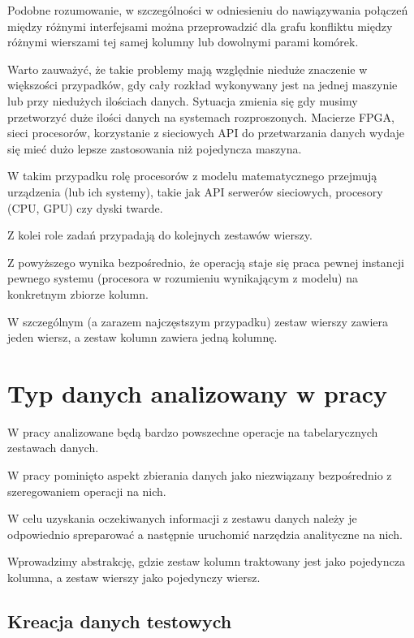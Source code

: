 \documentclass[brudnopis]{xmgr}
\begin{document}
Podobne rozumowanie, w szczególności w odniesieniu do nawiązywania połączeń między różnymi interfejsami można przeprowadzić dla grafu konfliktu między różnymi wierszami tej samej kolumny lub dowolnymi parami komórek.

Warto zauważyć, że takie problemy mają względnie nieduże znaczenie w większości przypadków, gdy cały rozkład wykonywany jest na jednej maszynie lub przy niedużych ilościach danych. Sytuacja zmienia się gdy musimy przetworzyć duże ilości danych na systemach rozproszonych.
Macierze FPGA, sieci procesorów, korzystanie z sieciowych API do przetwarzania danych wydaje się mieć dużo lepsze zastosowania niż pojedyncza maszyna.

W takim przypadku rolę procesorów z modelu matematycznego przejmują urządzenia (lub ich systemy), takie jak API serwerów sieciowych, procesory (CPU, GPU) czy dyski twarde.

Z kolei role zadań przypadają do kolejnych zestawów wierszy.

Z powyższego wynika bezpośrednio, że operacją staje się praca pewnej instancji pewnego systemu (procesora w rozumieniu wynikającym z modelu) na konkretnym zbiorze kolumn.

W szczególnym (a zarazem najczęstszym przypadku) zestaw wierszy zawiera jeden wiersz, a zestaw kolumn zawiera jedną kolumnę.


\chapter{Typ danych analizowany w pracy}

W pracy analizowane będą bardzo powszechne operacje na tabelarycznych zestawach danych.

W pracy pominięto aspekt zbierania danych jako niezwiązany bezpośrednio z szeregowaniem operacji na nich.

W celu uzyskania oczekiwanych informacji z zestawu danych należy je odpowiednio spreparować a następnie uruchomić narzędzia analityczne na nich.

Wprowadzimy abstrakcję, gdzie zestaw kolumn traktowany jest jako pojedyncza kolumna, a zestaw wierszy jako pojedynczy wiersz.


\section{Kreacja danych testowych}
\end{document}
